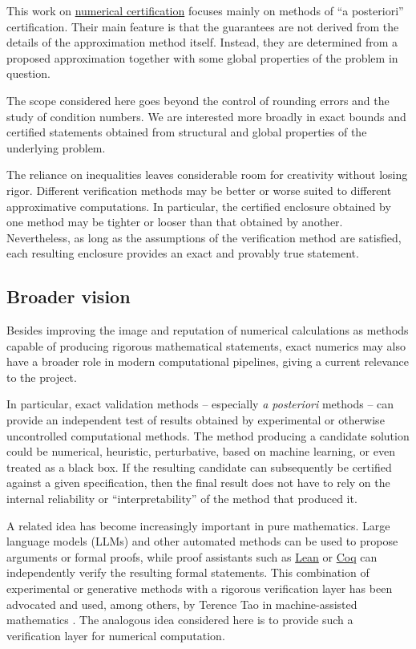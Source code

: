 \documentclass{article}
\theoremstyle{definition}
\begin{document}
This work on \href{https://en.wikipedia.org/wiki/Numerical_certification}{numerical certification} focuses mainly on methods of ``a posteriori'' certification. Their main feature is that the guarantees are not derived from the details of the approximation method itself. Instead, they are determined from a proposed approximation together with some global properties of the problem in question.

The scope considered here goes beyond the control of rounding errors and the study of condition numbers. We are interested more broadly in exact bounds and certified statements obtained from structural and global properties of the underlying problem.

The reliance on inequalities leaves considerable room for creativity without losing rigor. Different verification methods may be better or worse suited to different approximative computations. In particular, the certified enclosure obtained by one method may be tighter or looser than that obtained by another. Nevertheless, as long as the assumptions of the verification method are satisfied, each resulting enclosure provides an exact and provably true statement.

\subsection{Broader vision}

Besides improving the image and reputation of numerical calculations as methods capable of producing rigorous mathematical statements, exact numerics may also have a broader role in modern computational pipelines, giving a current relevance to the project.

In particular, exact validation methods -- especially \emph{a posteriori} methods -- can provide an independent test of results obtained by experimental or otherwise uncontrolled computational methods. The method producing a candidate solution could be numerical, heuristic, perturbative, based on machine learning, or even treated as a black box. If the resulting candidate can subsequently be certified against a given specification, then the final result does not have to rely on the internal reliability or ``interpretability'' of the method that produced it.

A related idea has become increasingly important in pure mathematics. Large language models (LLMs) and other automated methods can be used to propose arguments or formal proofs, while proof assistants such as \href{https://lean-lang.org/}{Lean} or \href{https://rocq-prover.org/}{Coq} can independently verify the resulting formal statements. This combination of experimental or generative methods with a rigorous verification layer has been advocated and used, among others, by Terence Tao in machine-assisted mathematics \cite{paper:Tao2025}. The analogous idea considered here is to provide such a verification layer for numerical computation.
\end{document}
